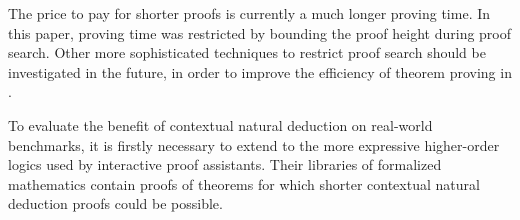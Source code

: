 \documentclass{llncs}
\begin{document}
The price to pay for shorter proofs is currently a much longer proving time. In this paper, proving time was restricted by bounding the proof height during proof search. Other more sophisticated techniques to restrict proof search should be investigated in the future, in order to improve the efficiency of theorem proving in {\NDd}.

To evaluate the benefit of contextual natural deduction on real-world benchmarks, it is firstly necessary to extend {\NDd} to the more expressive higher-order logics used by interactive proof assistants. Their libraries of formalized mathematics contain proofs of theorems for which shorter contextual natural deduction proofs could be possible. 




\end{document}
